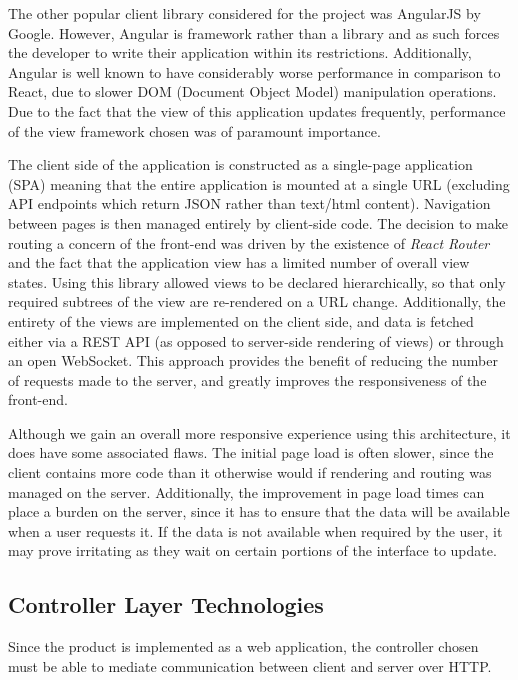 \documentclass{l4proj}
\begin{document}
        The other popular client library considered for the project was AngularJS by Google. However, Angular is framework rather than a library and as such forces the developer to write their application within its restrictions. Additionally, Angular is well known to have considerably worse performance in comparison to React, due to slower DOM (Document Object Model) manipulation operations. Due to the fact that the view of this application updates frequently, performance of the view framework chosen was of paramount importance.
        
    The client side of the application is constructed as a single-page application (SPA) meaning that the entire application is mounted at a single URL (excluding API endpoints which return JSON rather than text/html content). Navigation between pages is then managed entirely by client-side code. The decision to make routing a concern of the front-end was driven by the existence of \textit{React Router} and the fact that the application view has a limited number of overall view states. Using this library allowed views to be declared hierarchically, so that only required subtrees of the view are re-rendered on a URL change.
Additionally, the entirety of the views are implemented on the client side, and data is fetched either via a REST API (as opposed to server-side rendering of views) or through an open WebSocket. This approach provides the benefit of reducing the number of requests made to the server, and greatly improves the responsiveness of the front-end. 

Although we gain an overall more responsive experience using this architecture, it does have some associated flaws. The initial page load is often slower, since the client contains more code than it otherwise would if rendering and routing was managed on the server. Additionally, the improvement in page load times can place a burden on the server, since it has to ensure that the data will be available when a user requests it. If the data is not available when required by the user, it may prove irritating as they wait on certain portions of the interface to update.

\subsection{Controller Layer Technologies}
        
        Since the product is implemented as a web application, the controller chosen must be able to mediate communication between client and server over HTTP.
\end{document}
